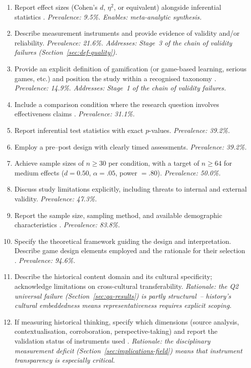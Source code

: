 \begin{enumerate}
\item[\textbf{T1.}] Report effect sizes (Cohen's $d$, $\eta^2$, or equivalent) alongside inferential statistics \cite{Borenstein2009, Cohen1960}. \emph{Prevalence: 9.5\%. Enables: meta-analytic synthesis.}
\item[\textbf{T1.}] Describe measurement instruments and provide evidence of validity and/or reliability. \emph{Prevalence: 21.6\%. Addresses: Stage~3 of the chain of validity failures (Section~\ref{sec:def-quality}).}
\item[\textbf{T1.}] Provide an explicit definition of gamification (or game-based learning, serious games, etc.) and position the study within a recognised taxonomy \cite{Deterding2011, 36Scholz2021, Buckley2018}. \emph{Prevalence: 14.9\%. Addresses: Stage~1 of the chain of validity failures.}
\item[\textbf{T2.}] Include a comparison condition where the research question involves effectiveness claims \cite{Schulz2010CONSORT, HigginsThomas2019}. \emph{Prevalence: 31.1\%.}
\item[\textbf{T2.}] Report inferential test statistics with exact $p$-values. \emph{Prevalence: 39.2\%.}
\item[\textbf{T2.}] Employ a pre--post design with clearly timed assessments. \emph{Prevalence: 39.2\%.}
\item[\textbf{T2.}] Achieve sample sizes of $n \geq 30$ per condition, with a target of $n \geq 64$ for medium effects ($d = 0.50$, $\alpha = .05$, power $= .80$). \emph{Prevalence: 50.0\%.}
\item[\textbf{T2.}] Discuss study limitations explicitly, including threats to internal and external validity. \emph{Prevalence: 47.3\%.}
\item[\textbf{T3.}] Report the sample size, sampling method, and available demographic characteristics \cite{Schulz2010CONSORT}. \emph{Prevalence: 83.8\%.}
\item[\textbf{T3.}] Specify the theoretical framework guiding the design and interpretation. Describe game design elements employed and the rationale for their selection \cite{SEABORN201514, Sailer2017}. \emph{Prevalence: 94.6\%.}
\item[\textbf{H.}] Describe the historical content domain and its cultural specificity; acknowledge limitations on cross-cultural transferability. \emph{Rationale: the Q2 universal failure (Section~\ref{sec:qa-results}) is partly structural~-- history's cultural embeddedness means representativeness requires explicit scoping.}
\item[\textbf{H.}] If measuring historical thinking, specify which dimensions (source analysis, contextualisation, corroboration, perspective-taking) and report the validation status of instruments used \cite{MonteSano2012, Reisman2012}. \emph{Rationale: the disciplinary measurement deficit (Section~\ref{sec:implications-field}) means that instrument transparency is especially critical.}
\end{enumerate}


